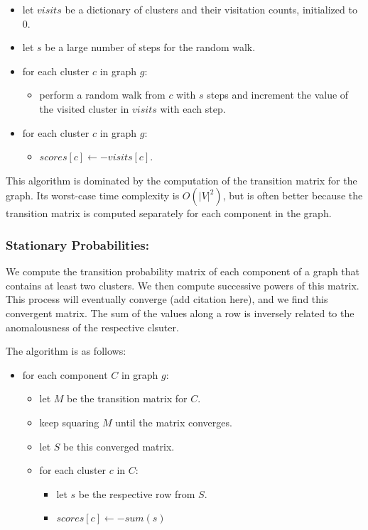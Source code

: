 \begin{itemize}
    \item let $visits$ be a dictionary of clusters and their visitation counts, initialized to $0$.
    \item let $s$ be a large number of steps for the random walk.
    \item for each cluster $c$ in graph $g$:
    \begin{itemize}
        \item perform a random walk from $c$ with $s$ steps and increment the value of the visited cluster in $visits$ with each step.
    \end{itemize}
    \item for each cluster $c$ in graph $g$:
    \begin{itemize}
        \item $scores[c] \leftarrow -visits[c]$.
    \end{itemize}
\end{itemize}

This algorithm is dominated by the computation of the transition matrix for the graph.
Its worst-case time complexity is $O(|V|^2)$, but is often better because the transition matrix is computed separately for each component in the graph.

\subsubsection{Stationary Probabilities:}
We compute the transition probability matrix of each component of a graph that contains at least two clusters.
We then compute successive powers of this matrix.
This process will eventually converge (add citation here), and we find this convergent matrix.
The sum of the values along a row is inversely related to the anomalousness of the respective clsuter.

The algorithm is as follows:

\begin{itemize}
    \item for each component $C$ in graph $g$:
    \begin{itemize}
        \item let $M$ be the transition matrix for $C$.
        \item keep squaring $M$ until the matrix converges.
        \item let $S$ be this converged matrix.
        \item for each cluster $c$ in $C$:
        \begin{itemize}
            \item let $s$ be the respective row from $S$.
            \item $scores[c] \leftarrow -sum(s)$
        \end{itemize}
    \end{itemize}
\end{itemize}


